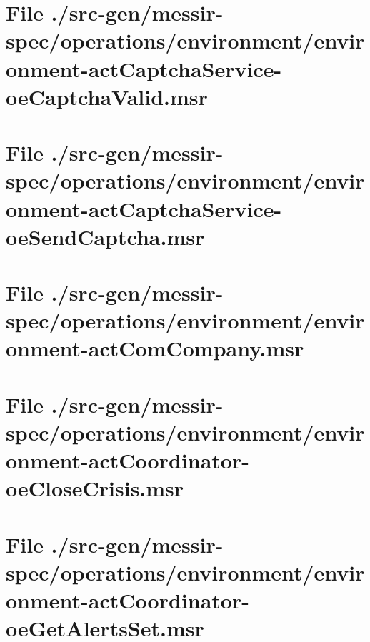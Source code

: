\section[File /src-gen/messir-spec.../environment-actCaptchaService-oeCaptchaValid.msr]{File ./src-gen/messir-spec/operations/environment/environment-actCaptchaService-oeCaptchaValid.msr}
\scriptsize

\normalsize
	
\section[File /src-gen/messir-spec.../environment-actCaptchaService-oeSendCaptcha.msr]{File ./src-gen/messir-spec/operations/environment/environment-actCaptchaService-oeSendCaptcha.msr}
\scriptsize

\normalsize
	
\section[File /src-gen/messir-spec/operations/environment/environment-actComCompany.msr]{File ./src-gen/messir-spec/operations/environment/environment-actComCompany.msr}
\scriptsize

\normalsize
	
\section[File /src-gen/messir-spec.../environment-actCoordinator-oeCloseCrisis.msr]{File ./src-gen/messir-spec/operations/environment/environment-actCoordinator-oeCloseCrisis.msr}
\scriptsize

\normalsize
	
\section[File /src-gen/messir-spec.../environment-actCoordinator-oeGetAlertsSet.msr]{File ./src-gen/messir-spec/operations/environment/environment-actCoordinator-oeGetAlertsSet.msr}
\scriptsize

\normalsize
	
